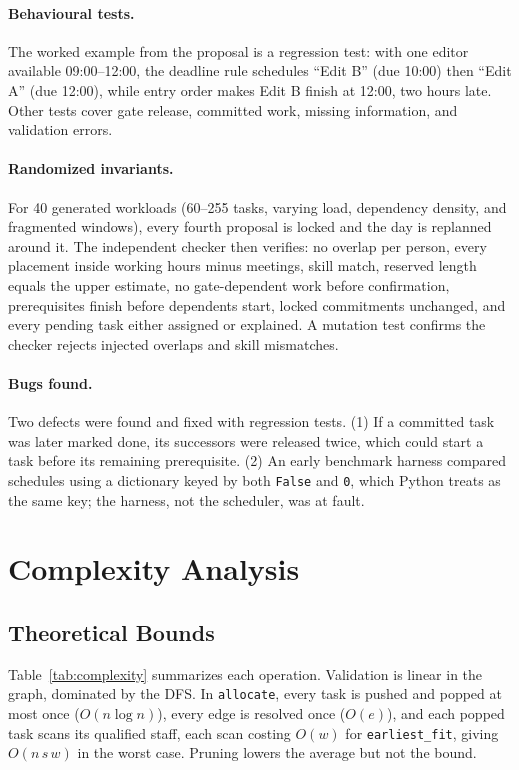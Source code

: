 \documentclass[sigconf,nonacm]{acmart}
\begin{document}
\paragraph{Behavioural tests.} The worked example from the proposal is a regression test:
with one editor available 09:00--12:00, the deadline rule schedules ``Edit B'' (due 10:00)
then ``Edit A'' (due 12:00), while entry order makes Edit B finish at 12:00, two hours late.
Other tests cover gate release, committed work, missing information, and validation errors.

\paragraph{Randomized invariants.} For 40 generated workloads (60--255 tasks, varying load,
dependency density, and fragmented windows), every fourth proposal is locked and the day is
replanned around it. The independent checker then verifies: no overlap per person, every
placement inside working hours minus meetings, skill match, reserved length equals the upper
estimate, no gate-dependent work before confirmation, prerequisites finish before dependents
start, locked commitments unchanged, and every pending task either assigned or explained.
A mutation test confirms the checker rejects injected overlaps and skill mismatches.

\paragraph{Bugs found.} Two defects were found and fixed with regression tests. (1) If a
committed task was later marked done, its successors were released twice, which could start
a task before its remaining prerequisite. (2) An early benchmark harness compared schedules
using a dictionary keyed by both \texttt{False} and \texttt{0}, which Python treats as the
same key; the harness, not the scheduler, was at fault.

\section{Complexity Analysis}
\subsection{Theoretical Bounds}
Table~\ref{tab:complexity} summarizes each operation. Validation is linear in the graph,
dominated by the DFS. In \texttt{allocate}, every task is pushed and popped at most once
($O(n \log n)$), every edge is resolved once ($O(e)$), and each popped task scans its
qualified staff, each scan costing $O(w)$ for \texttt{earliest\_fit}, giving $O(n\,s\,w)$
in the worst case. Pruning lowers the average but not the bound.
\end{document}
